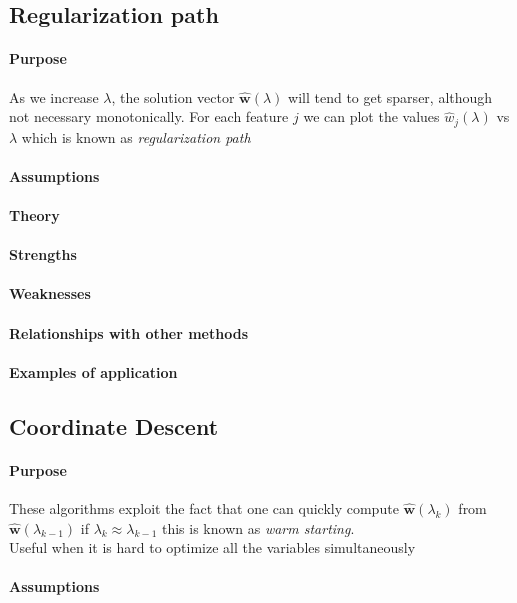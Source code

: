 \subsection{Regularization path}
\paragraph{Purpose}
As we increase $\lambda$, the solution vector $\hat{\bm{w}}(\lambda)$ will tend to get
sparser, although not necessary monotonically. For each feature $j$ we can plot the 
values $\hat{w}_{j}(\lambda)$ vs $\lambda$ which is known as \emph{regularization path}
\paragraph{Assumptions}
\paragraph{Theory}
\paragraph{Strengths}
\paragraph{Weaknesses}
\paragraph{Relationships with other methods}
\paragraph{Examples of application}

\subsection{Coordinate Descent}
\paragraph{Purpose}
These algorithms exploit the fact that one can quickly compute $\hat{\bm{w}}(
\lambda_{k})$ from $\hat{\bm{w}}(\lambda_{k-1})$ if $\lambda_{k} \approx \lambda_{k-1}$
this is known as \emph{warm starting}.\\
Useful when it is hard to optimize all the variables simultaneously 
\paragraph{Assumptions}
